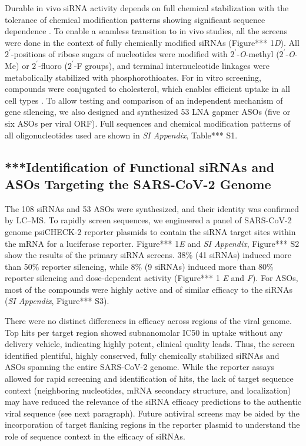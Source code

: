 \documentclass{report}
\begin{document}
Durable in vivo siRNA activity depends on full chemical stabilization \cite{hassler_comparison_2018} with the tolerance of chemical modification patterns showing significant sequence dependence \cite{shmushkovich_functional_2018}. To enable a seamless transition to in vivo studies, all the screens were done in the context of fully chemically modified siRNAs (Figure*** 1\textit{D}). All $2^\prime$-positions of ribose sugars of nucleotides were modified with $2^\prime$-\textit{O}-methyl ($2^\prime$-\textit{O}-Me) or $2^\prime$-fluoro ($2^\prime$-F groups), and terminal internucleotide linkages were metabolically stabilized with phosphorothioates. For in vitro screening, compounds were conjugated to cholesterol, which enables efficient uptake in all cell types \cite{alterman_hydrophobically_2015}. To allow testing and comparison of an independent mechanism of gene silencing, we also designed and synthesized 53 LNA gapmer ASOs (five or six ASOs per viral ORF). Full sequences and chemical modification patterns of all oligonucleotides used are shown in \textit{SI Appendix}, Table*** S1. 

\subsection{***Identification of Functional siRNAs and ASOs Targeting the SARS-CoV-2 Genome}
The 108 siRNAs and 53 ASOs were synthesized, and their identity was confirmed by LC–MS. To rapidly screen sequences, we engineered a panel of SARS-CoV-2 genome psiCHECK-2 reporter plasmids to contain the siRNA target sites within the mRNA for a luciferase reporter. Figure*** 1\textit{E }and \textit{SI Appendix}, Figure*** S2 show the results of the primary siRNA screens. 38\% (41 siRNAs) induced more than 50\% reporter silencing, while 8\% (9 siRNAs) induced more than 80\% reporter silencing and dose-dependent activity (Figure*** 1 \textit{E }and \textit{F}). For ASOs, most of the compounds were highly active and of similar efficacy to the siRNAs (\textit{SI Appendix}, Figure*** S3). 

There were no distinct differences in efficacy across regions of the viral genome. Top hits per target region showed subnanomolar IC50 in uptake without any delivery vehicle, indicating highly potent, clinical quality leads. Thus, the screen identified plentiful, highly conserved, fully chemically stabilized siRNAs and ASOs spanning the entire SARS-CoV-2 genome. While the reporter assays allowed for rapid screening and identification of hits, the lack of target sequence context (neighboring nucleotides, mRNA secondary structure, and localization) may have reduced the relevance of the siRNA efficacy predictions to the authentic viral sequence (see next paragraph). Future antiviral screens may be aided by the incorporation of target flanking regions in the reporter plasmid to understand the role of sequence context in the efficacy of siRNAs. 
\end{document}
